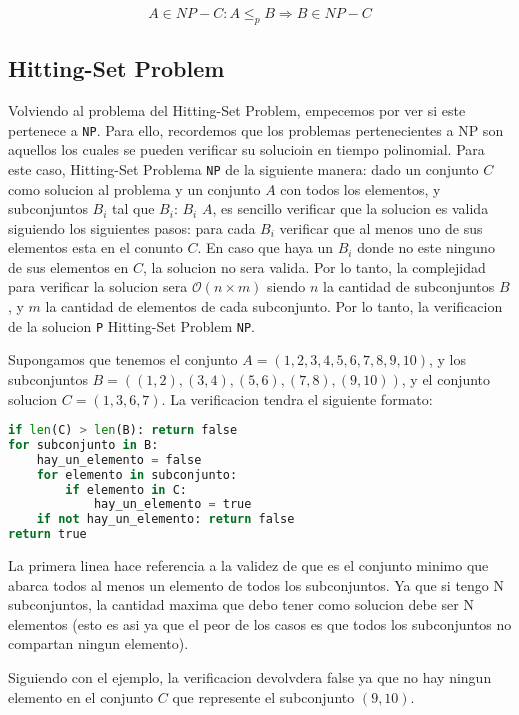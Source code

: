 \[ A \in {NP-C}: A \leq _p B \Rightarrow B \in NP-C \]

\subsection{Hitting-Set Problem}

Volviendo al problema del Hitting-Set Problem, empecemos por ver si este pertenece a \texttt{NP}. Para ello, recordemos que los problemas pertenecientes a NP son aquellos los cuales se pueden verificar su solucioin en tiempo polinomial. Para este caso, Hitting-Set Problema \in \texttt{NP} de la siguiente manera: dado un conjunto $C$ como solucion al problema y un conjunto $A$ con todos los elementos, y subconjuntos $B_i$ tal que \forall $B_i$: $B_i$ \subseteq $A$, es sencillo verificar que la solucion es valida siguiendo los siguientes pasos: para cada $B_i$ verificar que al menos uno de sus elementos esta en el conunto $C$. En caso que haya un $B_i$ donde no este ninguno de sus elementos en $C$, la solucion no sera valida. Por lo tanto, la complejidad para verificar la solucion sera $\mathcal{O}(n \times m)$ siendo $n$ la cantidad de subconjuntos $B$, y $m$ la cantidad de elementos de cada subconjunto. Por lo tanto, la verificacion de la solucion \subset \texttt{P} \Rightarrow Hitting-Set Problem \in \texttt{NP}.

Supongamos que tenemos el conjunto $A = (1, 2, 3, 4, 5, 6, 7, 8, 9, 10)$, y los subconjuntos $B = ((1, 2), (3, 4), (5, 6), (7, 8), (9, 10))$, y el conjunto solucion $C = (1, 3, 6, 7)$. La verificacion tendra el siguiente formato:

\begin{lstlisting}[language=Python]
if len(C) > len(B): return false
for subconjunto in B:
    hay_un_elemento = false
    for elemento in subconjunto:
        if elemento in C:
            hay_un_elemento = true
    if not hay_un_elemento: return false
return true
\end{lstlisting}

La primera linea hace referencia a la validez de que es el conjunto minimo que abarca todos al menos un elemento de todos los subconjuntos. Ya que si tengo N subconjuntos, la cantidad maxima que debo tener como solucion debe ser N elementos (esto es asi ya que el peor de los casos es que todos los subconjuntos no compartan ningun elemento).

Siguiendo con el ejemplo, la verificacion devolvdera false ya que no hay ningun elemento en el conjunto $C$ que represente el subconjunto $(9, 10)$.


